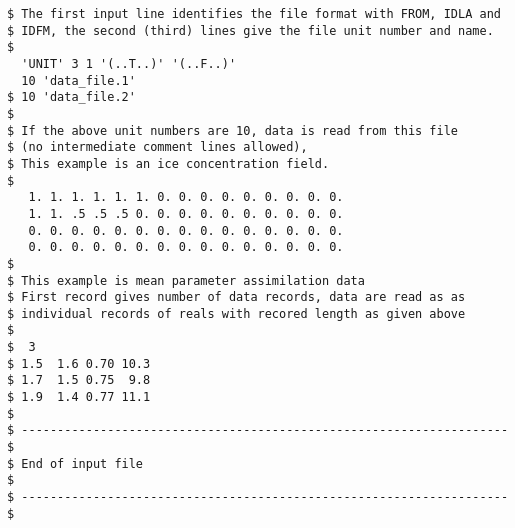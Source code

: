 \begin{verbatim}
$ The first input line identifies the file format with FROM, IDLA and
$ IDFM, the second (third) lines give the file unit number and name.
$
  'UNIT' 3 1 '(..T..)' '(..F..)' 
  10 'data_file.1'
$ 10 'data_file.2'
$
$ If the above unit numbers are 10, data is read from this file
$ (no intermediate comment lines allowed),
$ This example is an ice concentration field.
$
   1. 1. 1. 1. 1. 1. 0. 0. 0. 0. 0. 0. 0. 0. 0.
   1. 1. .5 .5 .5 0. 0. 0. 0. 0. 0. 0. 0. 0. 0.
   0. 0. 0. 0. 0. 0. 0. 0. 0. 0. 0. 0. 0. 0. 0.
   0. 0. 0. 0. 0. 0. 0. 0. 0. 0. 0. 0. 0. 0. 0.
$
$ This example is mean parameter assimilation data
$ First record gives number of data records, data are read as as
$ individual records of reals with recored length as given above
$
$  3
$ 1.5  1.6 0.70 10.3
$ 1.7  1.5 0.75  9.8
$ 1.9  1.4 0.77 11.1
$
$ -------------------------------------------------------------------- $
$ End of input file                                                    $
$ -------------------------------------------------------------------- $
\end{verbatim}
